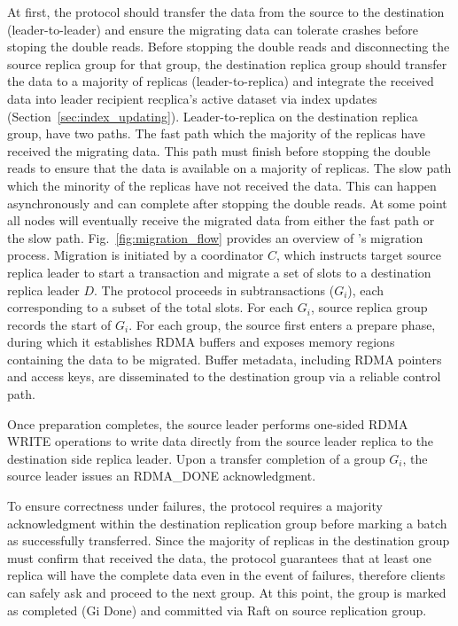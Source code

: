 At first, the protocol should transfer the data from the source to the destination (leader-to-leader) and ensure the migrating data can tolerate crashes before stoping the double reads. 
Before stopping the double reads and disconnecting the source replica group for that group, the destination replica group should transfer the data to a majority of replicas (leader-to-replica) 
and integrate the received data into leader recipient recplica's active dataset via index updates (Section~\ref{sec:index_updating}). 
Leader-to-replica on the destination replica group, have two paths. The fast path which the majority of the replicas have received the migrating data. This path must finish before stopping the double reads to ensure that the data is available on a majority of replicas. 
The slow path which the minority of the replicas have not received the data. This can happen asynchronously and can complete after stopping the double reads. 
At some point all nodes will eventually receive the migrated data from either the fast path or the slow path.
Fig.~\ref{fig:migration_flow} provides an overview of \OurImplementation{}’s migration process. 
Migration is initiated by a coordinator $C$, which instructs target source replica leader to start a transaction and migrate a set of slots to a destination replica leader $D$.
The protocol proceeds in subtransactions ($G_i$), each corresponding to a subset of the total slots. 
For each $G_i$, source replica group records the start of $G_i$.
For each group, the source first enters a prepare phase, during which it establishes RDMA buffers and exposes memory regions containing the data to be migrated. 
Buffer metadata, including RDMA pointers and access keys, are disseminated to the destination group via a reliable control path.


Once preparation completes, 
the source leader performs one-sided RDMA WRITE operations to write data directly from the source leader replica to the destination side replica leader. 
Upon a transfer completion of a group $G_i$, the source leader issues an RDMA\_DONE acknowledgment.


To ensure correctness under failures, the protocol requires a majority acknowledgment within the destination replication group before marking a batch as successfully transferred. 
Since the majority of replicas in the destination group must confirm that received the data, the protocol guarantees that at least one replica will have the complete data even in the event of failures, therefore clients can safely ask and proceed to the next group.
At this point, the group is marked as completed (Gi Done) and committed via Raft on source replication group.

